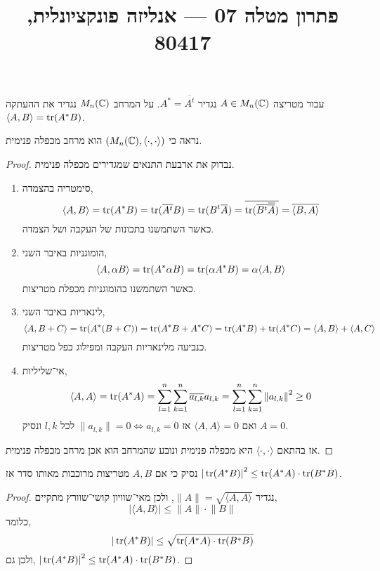 
\title{פתרון מטלה 07 --- אנליזה פונקציונלית, 80417}


\maketitle
\maketitleprint[teal]

\question{}
עבור מטריצה $A \in M_n(\mathbb{C})$ נגדיר $A^* = \overline{A^t}$.
על המרחב $M_n(\mathbb{C})$ נגדיר את ההעתקה $\langle A, B \rangle = \operatorname{tr}(A^* B)$.

\subquestion{}
נראה כי $(M_n(\mathbb{C}), \langle \cdot, \cdot \rangle)$ הוא מרחב מכפלה פנימית.
\begin{proof}
	נבדוק את ארבעת התנאים שמגדירים מכפלה פנימית.
	\begin{enumerate}
		\item סימטריה בהצמדה,
			\[
				\langle A, B \rangle
				= \operatorname{tr}(A^* B)
				= \operatorname{tr}(\overline{A^t} B)
				= \operatorname{tr}(B^t \overline{A})
				= \overline{\operatorname{tr}(\overline{B^t} \overline{\overline{A}})}
				= \overline{\langle B, A \rangle}
			\]
			כאשר השתמשנו בתכונות של העקבה ושל הצמדה.
		\item הומוגניות באיבר השני,
			\[
				\langle A, \alpha B \rangle
				= \operatorname{tr}(A^* \alpha B)
				= \operatorname{tr}(\alpha A^* B)
				= \alpha \langle A, B \rangle
			\]
			כאשר השתמשנו בהומוגניות מכפלת מטריצות.
		\item לינאריות באיבר השני,
			\[
				\langle A, B + C \rangle
				= \operatorname{tr}(A^* (B + C))
				= \operatorname{tr}(A^* B + A^* C)
				= \operatorname{tr}(A^* B) + \operatorname{tr}(A^* C)
				= \langle A, B \rangle + \langle A, C \rangle
			\]
			כנביעה מלינאריות העקבה ומפילוג כפל מטריצות.
		\item אי־שליליות,
			\[
				\langle A, A \rangle
				= \operatorname{tr}(A^* A)
				= \sum_{l = 1}^n \sum_{k = 1}^n \overline{a_{l, k}} a_{l, k}
				= \sum_{l = 1}^n \sum_{k = 1}^n {\lVert a_{l, k} \rVert}^2
				\ge 0
			\]
			ואם $\langle A, A \rangle = 0$ אז $\lVert a_{l, k} \rVert = 0 \iff a_{l, k} = 0$ לכל $l, k$ ונסיק $A = 0$.
	\end{enumerate}
	אז בהתאם $\langle \cdot, \cdot \rangle$ היא מכפלה פנימית ונובע שהמרחב הוא אכן מרחב מכפלה פנימית.
\end{proof}

\subquestion{}
נסיק כי אם $A, B$ מטריצות מרוכבות מאותו סדר אז ${| \operatorname{tr}(A^* B) |}^2 \le \operatorname{tr}(A^* A) \cdot \operatorname{tr}(B^* B)$.
\begin{proof}
	נגדיר $\lVert A \rVert = \sqrt{\langle A, A \rangle}$, ולכן מאי־שוויון קושי־שוורץ מתקיים,
	\[
		| \langle A, B \rangle |
		\le \lVert A \rVert \cdot \lVert B \rVert
	\]
	כלומר,
	\[
		|\operatorname{tr}(A^* B)|
		\le \sqrt{\operatorname{tr}(A^* A) \cdot \operatorname{tr}(B^* B)}
	\]
	ולכן גם, ${| \operatorname{tr}(A^* B) |}^2 \le \operatorname{tr}(A^* A) \cdot \operatorname{tr}(B^* B)$.
\end{proof}

